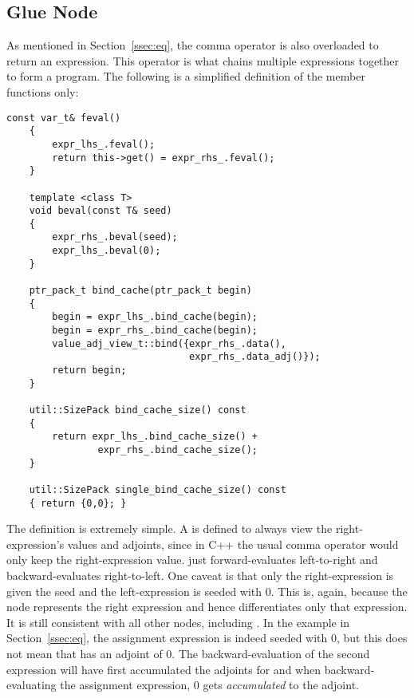 \subsection{Glue Node}\label{ssec:glue}

As mentioned in Section~\ref{ssec:eq},
the comma operator is also overloaded to return an expression.
This operator is what chains multiple expressions together to form a program.
The following is a simplified definition of the member functions only:
\begin{lstlisting}[style=customcpp]
    const var_t& feval()
    {
        expr_lhs_.feval(); 
        return this->get() = expr_rhs_.feval();
    }

    template <class T>
    void beval(const T& seed)
    {
        expr_rhs_.beval(seed); 
        expr_lhs_.beval(0);
    }

    ptr_pack_t bind_cache(ptr_pack_t begin)
    {
        begin = expr_lhs_.bind_cache(begin);
        begin = expr_rhs_.bind_cache(begin);
        value_adj_view_t::bind({expr_rhs_.data(), 
                                expr_rhs_.data_adj()});
        return begin;
    }

    util::SizePack bind_cache_size() const 
    { 
        return expr_lhs_.bind_cache_size() + 
                expr_rhs_.bind_cache_size();
    }

    util::SizePack single_bind_cache_size() const
    { return {0,0}; }
\end{lstlisting}
The definition is extremely simple.
A  is defined to always view the right-expression's values and adjoints,
since in C++ the usual comma operator would only keep the right-expression value.
 just forward-evaluates left-to-right and  backward-evaluates right-to-left.
One caveat is that only the right-expression is given the seed and the left-expression is seeded with 0.
This is, again, because the node represents the right expression and hence differentiates only that expression.
It is still consistent with all other nodes, including .
In the example in Section~\ref{ssec:eq}, the assignment expression is indeed seeded with 0,
but this does not mean that  has an adjoint of 0.
The backward-evaluation of the second expression will have first accumulated the adjoints for 
and when backward-evaluating the assignment expression, 0 gets \emph{accumulated} to the adjoint.
